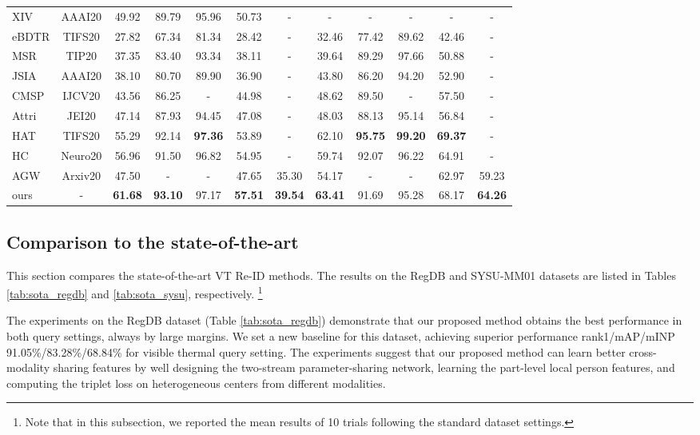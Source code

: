 \documentclass[journal]{IEEEtran}
\begin{document}
\begin{table*}
\begin{tabular}{l|c|c|c|c|c|c||c|c|c|c|c}
      XIV \cite{Li2020InfraredVisibleCP} & AAAI20 & 49.92 & 89.79 & 95.96 & 50.73 &- &  - & - & - & - & - \\
      eBDTR \cite{Ye2020DeepLF} & TIFS20 & 27.82 & 67.34 & 81.34 & 28.42 &- & 32.46 & 77.42 & 89.62 & 42.46 &- \\
      MSR \cite{Feng2020LearningMR} & TIP20 & 37.35 & 83.40 & 93.34 & 38.11 &- & 39.64 & 89.29 & 97.66 & 50.88 &- \\
      JSIA \cite{Wang2020CrossModalityPG} & AAAI20 & 38.10 & 80.70 & 89.90 & 36.90 &- & 43.80 & 86.20 & 94.20 & 52.90 &- \\
      CMSP \cite{wu2020rgb} & IJCV20 & 43.56  & 86.25 & - & 44.98 &- & 48.62  & 89.50 & -  & 57.50 &- \\
      Attri \cite{zhang20deepfl} & JEI20 & 47.14 & 87.93 & 94.45 & 47.08 & -& 48.03 & 88.13 & 95.14 & 56.84 &- \\
      HAT \cite{ye2018vipr} & TIFS20 & 55.29 & 92.14 & \textbf{97.36} & 53.89 & -& 62.10 & \textbf{95.75} & \textbf{99.20} & \textbf{69.37} &- \\
      HC \cite{zhu2019hetero} & Neuro20 & 56.96 & 91.50 & 96.82 & 54.95 &- & 59.74 & 92.07 & 96.22 & 64.91 &- \\
AGW \cite{Ye2020DeepLF} & Arxiv20 & 47.50 & - & - & 47.65 & 35.30 & 54.17 & - & -& 62.97 & 59.23 \\ \hline
      ours & - & \textbf{61.68}  & \textbf{93.10} & 97.17 & \textbf{57.51} & \textbf{39.54} & \textbf{63.41} & 91.69 & 95.28 & 68.17 & \textbf{64.26} \\
      \toprule[2pt]
  \end{tabular}
\end{table*}

\subsection{Comparison to the state-of-the-art}
\label{ssec:sota}

This section compares the state-of-the-art VT Re-ID methods. The results on the RegDB and SYSU-MM01 datasets are listed in Tables \ref{tab:sota_regdb} and \ref{tab:sota_sysu}, respectively. \footnote{Note that in this subsection, we reported the mean results of 10 trials following the standard dataset settings.}

The experiments on the RegDB dataset (Table \ref{tab:sota_regdb}) demonstrate that our proposed method obtains the best performance in both query settings, always by large margins. We set a new baseline for this dataset, achieving superior performance rank1/mAP/mINP 91.05\%/83.28\%/68.84\% for visible  thermal query setting. The experiments suggest that our proposed method can learn better cross-modality sharing features by well designing the two-stream parameter-sharing network, learning the part-level local person features, and computing the triplet loss on heterogeneous centers from different modalities.
\end{document}
